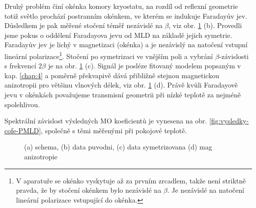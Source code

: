 Druhý problém činí okénka komory kryostatu, na rozdíl od reflexní geometrie totiž světlo prochází postranním okénkem, ve kterém se indukuje Faradayův jev.
Důsledkem je pak měřené stočení téměř nezávislé na $\beta$, viz obr. \ref{fig:vysledky-cofe-lowt-schema-data} (b).
Provedli jsme pokus o oddělení Faradayova jevu od MLD na základě jejich symetrie.
Faradayův jev je lichý v magnetizaci (okénka) a je nezávislý na natočení vstupní lineární polarizace\footnote{V aparatuře se okénko vyskytuje až za prvním zrcadlem, takže není striktně pravda, že by stočení okénkem bylo nezávislé na $\beta$. Je nezávislé na natočení lineární polarizace vstupující do okénka.}.
Stočení po symetrizaci ve vnějším poli a vybrání $\beta$-závislosti s frekvencí $2\beta$ je na obr. \ref{fig:vysledky-cofe-lowt-schema-data} (c).
Signál je posléze fitovaný modelem popsaným v kap. \ref{chap:4} a poměrně překvapivě dává přibližně stejnou magnetickou anizotropii pro většinu vlnových délek, viz obr. \ref{fig:vysledky-cofe-lowt-schema-data} (d).
Právě kvůli Faradayově jevu v okénkách považujeme transmisní geometrii při nízké teplotě za nejméně spolehlivou.

Spektrální závislost výsledných MO koeficientů je vynesena na obr. \ref{fig:vysledky-cofe-PMLD}, společně s těmi měřenými při pokojové teplotě.

\begin{figure}[htbp]
    \centering
    \missingfigure{}
    \caption{(a) schema, (b) data puvodni, (c) data symetrizovana (d) mag anizotropie}
    \label{fig:vysledky-cofe-lowt-schema-data}
\end{figure}

